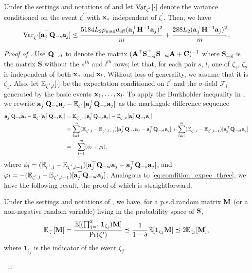 \documentclass[11pt,a4paper]{article}
\begin{document}
\begin{lemma}\label{lemma:cond_var}
Under the settings and notations of  and let $\Var_{\zeta^{'}}[\cdot]$ denote the variance conditioned on the event $\zeta^{'}$ with $\x_{s}$ independent of $\zeta^{'}$. 
Then, we have 
\begin{align}
    \Var_{\zeta^{'}}[\ba_j^\top\Q_{-s}\ba_j]\leq \frac{5184 L_2\rho_{\max}  d_{\eff}(\ba_j^\top\H^{-1}\ba_j)^2}{m} +\frac{288L_2(\ba_j^\top\H^{-1}\ba_j)^2}{m}.
   \nonumber
\end{align}
\end{lemma}
\begin{proof}[Proof of ]
Use  $\Q_{-sl}$ to denote the matrix $(\A^\top \mathbf{S}_{-sl}^\top\mathbf{S}_{-sl}\A+\C)^{-1}$ where $\mathbf{S}_{-sl}$ is the matrix $\mathbf{S}$ without the $s^{th}$ and $l^{th}$ rows; let that, for each pair $s$, $l$, one of $\zeta_1$, $\zeta_2$ is independent of both $\x_{s}$ and $\x_{l}$. Without loss of generality, we assume  that it is $\zeta_1$.    
Also, let $\EE_{\zeta^{'},l}[\cdot]$ be the expectation conditioned on $\zeta^{'}$ and  the $\sigma$-field  $\mathcal F_l$ generated by the basic events  $\x_{1},\ldots, \x_{l}.$ 
To apply the Burkholder inequality in , we rewrite $ \ba_j^\top\Q_{-s}\ba_j-\EE_{\zeta^{'}}[\ba_j^\top\Q_{-s}\ba_j] $ as the martingale difference sequence
\begin{align}
  \ba_j^\top\Q_{-s}\ba_j-\EE_{\zeta^{'}}[\ba_j^\top\Q_{-s}\ba_j]       
    &= \EE_{\zeta^{'},m} [\ba_j^\top\Q_{-s}\ba_j]   -\EE_{\zeta^{'},0} [\ba_j^\top\Q_{-s}\ba_j]  \nonumber\\
    &=\sum^m_{l=1} (\EE_{\zeta^{'},l}-\EE_{\zeta^{'},l-1} )[\ba_j^\top\Q_{-s}\ba_j-\ba_j^\top\Q_{-sl}\ba_j]      + \sum^m_{l=1}  (\EE_{\zeta^{'},l}-\EE_{\zeta^{'},l-1} )[\ba_j^\top\Q_{-sl}\ba_j] 
    \nonumber\\
    &=- \sum^m_{l=1}(\phi_l+\varphi_l), \nonumber
\end{align}
where $\phi_l= (\EE_{\zeta^{'},l}-\EE_{\zeta^{'},l-1})[\ba_j^\top\Q_{-sl}\ba_j-\ba_j^\top\Q_{-s}\ba_j]$, and $ \varphi_l=-(\EE_{\zeta^{'},l}-\EE_{\zeta^{'},l-1}) [\ba_j^\top\Q_{-sl}\ba_j]$. 
Analogous to \eqref{eq:condition_expec_three}, we have the following result, the proof of which is straightforward.
\begin{lemma}
Under the settings and notations of , we have, for a p.s.d.\@ random matrix $\M$ (or a non-negative random variable) living in the probability space of $\S$, 
\begin{align}
    \EE_{\zeta'}[\M]=\frac{\EE[(\prod^2_{j=1}\mathbf{1}_{\zeta_j})\M]}{\Pr(\zeta')} \preceq \frac{1}{1-\delta}  \EE[\mathbf{1}_{\zeta_{1}}\M] \preceq 2 \EE_{\zeta_1}[\M], \label{eq:condition_expec_two}
\end{align}
where $\mathbf{1}_{\zeta_j}$ is the indicator of the event $\zeta_j$.
\end{lemma}


\end{proof}
\end{document}
